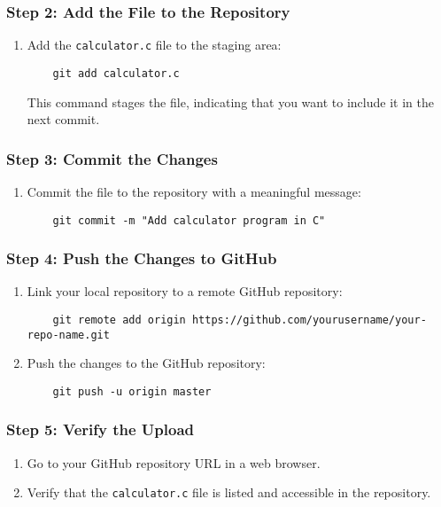 \documentclass[a4paper,15pt]{article}
\begin{document}
\begin{itemize}[leftmargin=1.5cm]
\subsubsection{Step 2: Add the File to the Repository}
\begin{enumerate}
    \item Add the \texttt{calculator.c} file to the staging area:
    \begin{verbatim}
    git add calculator.c
    \end{verbatim}
    This command stages the file, indicating that you want to include it in the next commit.
\end{enumerate}

\subsubsection{Step 3: Commit the Changes}
\begin{enumerate}
    \item Commit the file to the repository with a meaningful message:
    \begin{verbatim}
    git commit -m "Add calculator program in C"
    \end{verbatim}
\end{enumerate}

\subsubsection{Step 4: Push the Changes to GitHub}
\begin{enumerate}
    \item Link your local repository to a remote GitHub repository:
    \begin{verbatim}
    git remote add origin https://github.com/yourusername/your-repo-name.git
    \end{verbatim}
    \item Push the changes to the GitHub repository:
    \begin{verbatim}
    git push -u origin master
    \end{verbatim}
\end{enumerate}

\subsubsection{Step 5: Verify the Upload}
\begin{enumerate}
    \item Go to your GitHub repository URL in a web browser.
    \item Verify that the \texttt{calculator.c} file is listed and accessible in the repository.
\end{enumerate}



\end{itemize}
\end{document}
